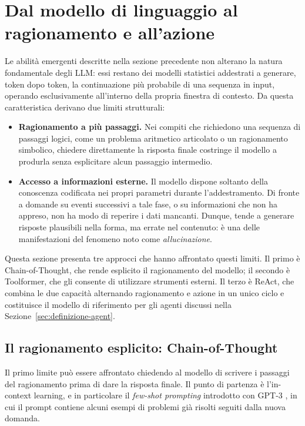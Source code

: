 \section{Dal modello di linguaggio al ragionamento e all'azione}
\label{sec:ragionamento-azione}


Le abilità emergenti descritte nella sezione precedente non alterano la natura fondamentale degli LLM: essi restano dei modelli statistici 
addestrati a generare, token dopo token, la continuazione più probabile di una sequenza in input, operando esclusivamente all'interno della propria finestra di contesto.
Da questa caratteristica derivano due limiti strutturali:

\begin{itemize}
\item \textbf{Ragionamento a più passaggi.} Nei compiti che richiedono una sequenza di passaggi logici, come un problema aritmetico articolato
 o un ragionamento simbolico, chiedere direttamente la risposta finale costringe il modello a produrla senza esplicitare alcun passaggio
  intermedio.
    \item \textbf{Accesso a informazioni esterne.} Il modello dispone soltanto della conoscenza codificata nei propri parametri durante
     l'addestramento. Di fronte a domande su eventi successivi a tale fase, o su informazioni che non ha appreso, non ha modo di reperire 
     i dati mancanti. Dunque, tende a generare risposte plausibili nella forma, ma errate nel contenuto: è una delle manifestazioni
    del fenomeno noto come \emph{allucinazione}.
\end{itemize}

Questa sezione presenta tre approcci che hanno affrontato questi limiti. Il primo è Chain-of-Thought, che rende esplicito il ragionamento
 del modello; il secondo è Toolformer, che gli consente di utilizzare strumenti esterni. Il terzo è ReAct, che combina le due capacità
  alternando ragionamento e azione in un unico ciclo e costituisce il modello di riferimento per gli agenti discussi 
  nella Sezione~\ref{sec:definizione-agent}.

\subsection{Il ragionamento esplicito: Chain-of-Thought}
\label{sec:cot}

Il primo limite può essere affrontato chiedendo al modello di scrivere i passaggi del ragionamento prima di dare la risposta finale. Il punto di partenza è l'in-context learning, e in particolare il \emph{few-shot prompting} introdotto con GPT-3 \cite{brown2020gpt3}, in cui il prompt contiene alcuni esempi di problemi già risolti seguiti dalla nuova domanda.

